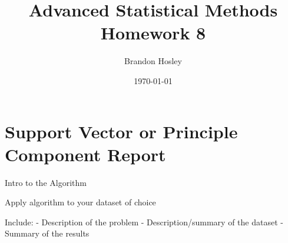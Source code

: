 \documentclass[a4paper,man,natbib]{apa6}
\title{Advanced Statistical Methods Homework 8}
\author{Brandon Hosley}
\date{\today}
\affiliation{University of Illinois - Springfield}
\begin{document}
\maketitle
\singlespacing

\section{Support Vector or Principle Component Report}

Intro to the Algorithm

Apply algorithm to your dataset of choice

Include:
- Description of the problem
- Description/summary of the dataset
- Summary of the results
\end{document}
